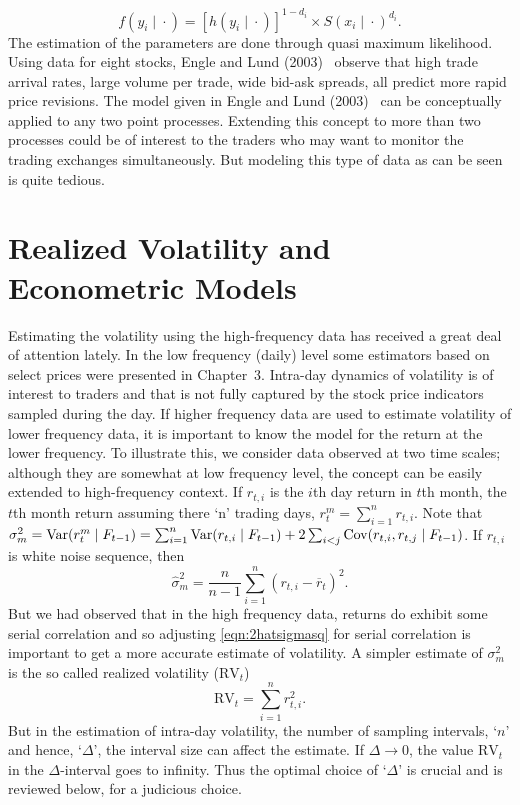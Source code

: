 	\begin{equation}\label{eqn:2fdot}
	f(y_i \;|\; \cdot) = [h(y_i \;|\; \cdot)]^{1 - d_i} \times S(x_i \;|\; \cdot)^{d_i}.
	\end{equation}
The estimation of the parameters are done through quasi maximum likelihood. Using data for eight stocks, Engle and Lund (2003)~\cite{englelunde} observe that high trade arrival rates, large volume per trade, wide bid-ask spreads, all predict more rapid price revisions. The model given in Engle and Lund (2003)~\cite{englelunde} can be conceptually applied to any two point processes. Extending this concept to more than two processes could be of interest to the traders who may want to monitor the trading exchanges simultaneously. But modeling this type of data as can be seen is quite tedious. 



\section{Realized Volatility and Econometric Models}


Estimating the volatility using the high-frequency data has received a great deal of attention lately. In the low frequency (daily) level some estimators based on select prices were presented in Chapter~3. Intra-day dynamics of volatility is of interest to traders and that is not fully captured by the stock price indicators sampled during the day. If higher frequency data are used to estimate volatility of lower frequency data, it is important to know the model for the return at the lower frequency. To illustrate this, we consider data observed at two time scales; although they are somewhat at low frequency level, the concept can be easily extended to high-frequency context. If $r_{t,i}$ is the $i$th day return in $t$th month, the $t$th month return assuming there `n' trading days, $r_t^m = \sum_{i=1}^n r_{t,i}$. Note that $\sigma_m^2 = \operatorname{Var}(r_t^m \;|\; F_{t-1}) = \sum_{i=1}^n \operatorname{Var}(r_{t,i} \;|\; F_{t-1}) + 2 \sum_{i<j} \operatorname{Cov}(r_{t,i}, r_{t,j} \;|\; F_{t-1})$. If $r_{t,i}$ is white noise sequence, then
	\begin{equation}\label{eqn:2hatsigmasq}
	\hat{\sigma}_m^2 = \frac{n}{n-1} \sum_{i=1}^n (r_{t,i} - \overline{r}_t)^2.
	\end{equation}
But we had observed that in the high frequency data, returns do exhibit some serial correlation and so adjusting \eqref{eqn:2hatsigmasq} for serial correlation is important to get a more accurate estimate of volatility. A simpler estimate of $\sigma_m^2$ is the so called realized volatility ($\text{RV}_t$)
	\begin{equation} \label{eqn:2RV}
	\text{RV}_t = \sum_{i=1}^n r_{t,i}^2.
	\end{equation}
But in the estimation of intra-day volatility, the number of sampling intervals, `$n$' and hence, `$\Delta$', the interval size can affect the estimate. If $\Delta \rightarrow 0$, the value $\text{RV}_t$ in the $\Delta$-interval goes to infinity. Thus the optimal choice of `$\Delta$' is crucial and is reviewed below, for a judicious choice.


